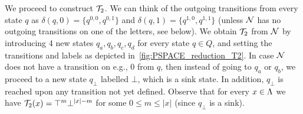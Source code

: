 We proceed to construct $\mathcal{T}_2$. 
We can think of the outgoing transitions from every state $q$ as $\delta(q,0)=\{q^{0,0},q^{0,1}\}$ and $\delta(q,1)=\{q^{1,0},q^{1,1}\}$ (unless $\mathcal{N}$ has no outgoing transitions on one of the letters, see below). We obtain $\mathcal{T}_2$ from $\mathcal{N}$ by introducing 4 new states $q_a,q_b,q_c,q_d$ for every state $q\in Q$, and setting the transitions and labels as depicted in~\cref{fig:PSPACE_reduction_T2}. In case $\mathcal{N}$ does not have a transition on e.g., $0$ from $q$, then instead of going to $q_a$ or $q_b$, we proceed to a new state $q_\bot$ labelled $\bot$, which is a sink state. In addition, $q_\bot$ is reached upon any transition not yet defined.
Observe that for every $x\in \Lambda$ we have $\mathcal{T}_2(x)=\top^{m}\bot^{|x|-m}$ for some $0\le m\le |x|$ (since $q_\bot$ is a sink).
		
		
